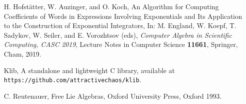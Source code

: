 \documentclass[11pt,a4paper]{article}
\begin{document}
\begin{thebibliography}{10}
 H. Hofstätter, W. Auzinger, and O. Koch,   An Algorithm for Computing Coefficients of Words in Expressions Involving Exponentials and Its Application to the Construction of Exponential Integrators, In: M. England, W. Koepf, T. Sadykov, W. Seiler, and E. Vorozhtsov (eds), {\it Computer Algebra in Scientific Computing, CASC 2019}, Lecture Notes in Computer Science {\bf 11661}, Springer, Cham, 2019. 

  Klib, A standalone and lightweight C library, available at {\tt https://github.com/attractivechaos/klib}.






 C. Reutenauer, Free Lie Algebras, Oxford University Press, Oxford 1993.




\end{thebibliography} 
\end{document}
